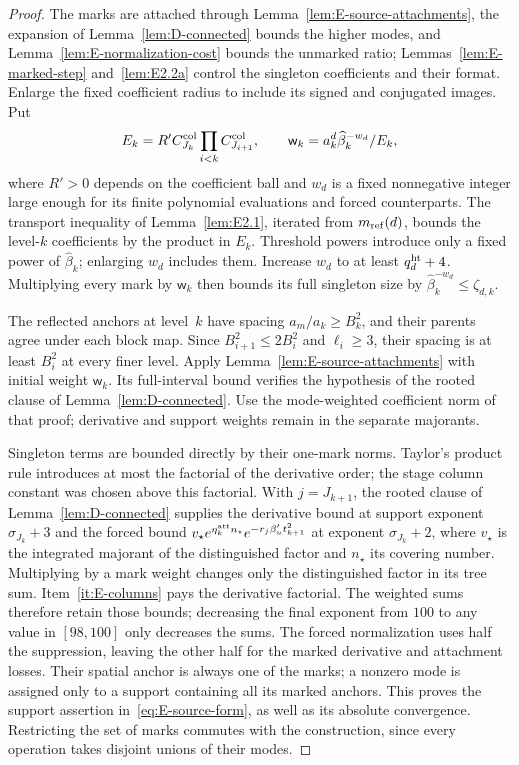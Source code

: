 \begin{proof}
The marks are attached through Lemma~\ref{lem:E-source-attachments}, the expansion of Lemma~\ref{lem:D-connected} bounds the higher modes, and Lemma~\ref{lem:E-normalization-cost} bounds the unmarked ratio; Lemmas~\ref{lem:E-marked-step} and~\ref{lem:E2.2a} control the singleton coefficients and their format. Enlarge the fixed coefficient radius to include its signed and conjugated images. Put
\begin{equation*}
 E_k=R' C^{\rm col}_{J_k}\prod_{i<k}C^{\rm col}_{J_{i+1}},\qquad
 \mathsf w_k=a_k^d\widehat\beta_k^{-w_d}/E_k,
\end{equation*}
where $R'>0$ depends on the coefficient ball and $w_d$ is a fixed nonnegative integer large enough for its finite polynomial evaluations and forced counterparts. The transport inequality of Lemma~\ref{lem:E2.1}, iterated from $m_{\mathrm{ref}}(d)$, bounds the level-$k$ coefficients by the product in $E_k$. Threshold powers introduce only a fixed power of $\widehat\beta_k$; enlarging $w_d$ includes them. Increase $w_d$ to at least $q^{\rm ht}_d+4$. Multiplying every mark by $\mathsf w_k$ then bounds its full singleton size by $\widehat\beta_k^{-w_d}\le\zeta_{d,k}$.

The reflected anchors at level~$k$ have spacing $a_m/a_k\ge B_k^2$, and their parents agree under each block map. Since $B_{i+1}^2\le2B_i^2$ and $\ell_i\ge3$, their spacing is at least $B_i^2$ at every finer level. Apply Lemma~\ref{lem:E-source-attachments} with initial weight $\mathsf w_k$. Its full-interval bound verifies the hypothesis of the rooted clause of Lemma~\ref{lem:D-connected}. Use the mode-weighted coefficient norm of that proof; derivative and support weights remain in the separate majorants.

Singleton terms are bounded directly by their one-mark norms. Taylor's product rule introduces at most the factorial of the derivative order; the stage column constant was chosen above this factorial. With $j=J_{k+1}$, the rooted clause of Lemma~\ref{lem:D-connected} supplies the derivative bound at support exponent $\sigma_{J_k}+3$ and the forced bound $v_\star e^{\eta^{\rm att}_kn_\star}e^{-r_j\beta'_u t_{k+1}^2}$ at exponent $\sigma_{J_k}+2$, where $v_\star$ is the integrated majorant of the distinguished factor and $n_\star$ its covering number. Multiplying by a mark weight changes only the distinguished factor in its tree sum. Item~\ref{it:E-columns} pays the derivative factorial. The weighted sums therefore retain those bounds; decreasing the final exponent from $100$ to any value in $[98,100]$ only decreases the sums. The forced normalization uses half the suppression, leaving the other half for the marked derivative and attachment losses. Their spatial anchor is always one of the marks; a nonzero mode is assigned only to a support containing all its marked anchors. This proves the support assertion in~\eqref{eq:E-source-form}, as well as its absolute convergence. Restricting the set of marks commutes with the construction, since every operation takes disjoint unions of their modes.


\end{proof}
